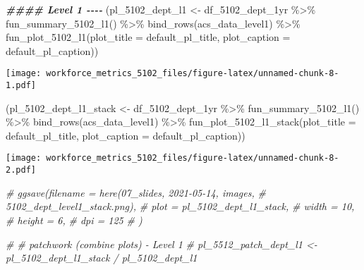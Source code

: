 \documentclass[
]{article}
\newenvironment{Shaded}{\begin{snugshade}}{\end{snugshade}}
\newcommand{\AttributeTok}[1]{\textcolor[rgb]{0.77,0.63,0.00}{#1}}
\newcommand{\CommentTok}[1]{\textcolor[rgb]{0.56,0.35,0.01}{\textit{#1}}}
\newcommand{\DocumentationTok}[1]{\textcolor[rgb]{0.56,0.35,0.01}{\textbf{\textit{#1}}}}
\newcommand{\FunctionTok}[1]{\textcolor[rgb]{0.00,0.00,0.00}{#1}}
\newcommand{\NormalTok}[1]{#1}
\newcommand{\OtherTok}[1]{\textcolor[rgb]{0.56,0.35,0.01}{#1}}
\newcommand{\SpecialCharTok}[1]{\textcolor[rgb]{0.00,0.00,0.00}{#1}}
\begin{document}
\begin{Shaded}
\begin{Highlighting}[]
\DocumentationTok{\#\#\#\# Level 1 {-}{-}{-}{-} }
\NormalTok{(pl\_5102\_dept\_l1 }\OtherTok{\textless{}{-}}\NormalTok{ df\_5102\_dept\_1yr }\SpecialCharTok{\%\textgreater{}\%} 
     \FunctionTok{fun\_summary\_5102\_l1}\NormalTok{() }\SpecialCharTok{\%\textgreater{}\%} 
     \FunctionTok{bind\_rows}\NormalTok{(acs\_data\_level1) }\SpecialCharTok{\%\textgreater{}\%} 
     \FunctionTok{fun\_plot\_5102\_l1}\NormalTok{(}\AttributeTok{plot\_title =}\NormalTok{ default\_pl\_title, }
                      \AttributeTok{plot\_caption =}\NormalTok{ default\_pl\_caption))}
\end{Highlighting}
\end{Shaded}

\texttt{[image: workforce\_metrics\_5102\_files/figure-latex/unnamed-chunk-8-1.pdf]}

\begin{Shaded}
\begin{Highlighting}[]
\NormalTok{(pl\_5102\_dept\_l1\_stack }\OtherTok{\textless{}{-}}\NormalTok{ df\_5102\_dept\_1yr }\SpecialCharTok{\%\textgreater{}\%} 
        \FunctionTok{fun\_summary\_5102\_l1}\NormalTok{() }\SpecialCharTok{\%\textgreater{}\%} 
        \FunctionTok{bind\_rows}\NormalTok{(acs\_data\_level1) }\SpecialCharTok{\%\textgreater{}\%} 
        \FunctionTok{fun\_plot\_5102\_l1\_stack}\NormalTok{(}\AttributeTok{plot\_title =}\NormalTok{ default\_pl\_title, }
                               \AttributeTok{plot\_caption =}\NormalTok{ default\_pl\_caption))}
\end{Highlighting}
\end{Shaded}

\texttt{[image: workforce\_metrics\_5102\_files/figure-latex/unnamed-chunk-8-2.pdf]}

\begin{Shaded}
\begin{Highlighting}[]
\CommentTok{\# ggsave(filename = here(\textquotesingle{}07\_slides\textquotesingle{}, \textquotesingle{}2021{-}05{-}14\textquotesingle{}, \textquotesingle{}images\textquotesingle{}, }
\CommentTok{\#                        \textquotesingle{}5102\_dept\_level1\_stack.png\textquotesingle{}), }
\CommentTok{\#        plot = pl\_5102\_dept\_l1\_stack, }
\CommentTok{\#        width = 10, }
\CommentTok{\#        height = 6, }
\CommentTok{\#        dpi = 125}
\CommentTok{\#        )}

\CommentTok{\# \# patchwork (combine plots) {-} Level 1}
\CommentTok{\# pl\_5512\_patch\_dept\_l1 \textless{}{-} pl\_5102\_dept\_l1\_stack / pl\_5102\_dept\_l1}
\end{Highlighting}
\end{Shaded}
\end{document}
